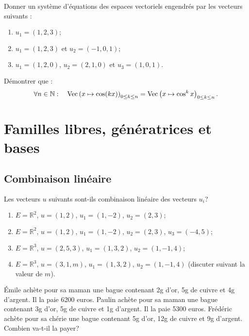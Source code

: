 \documentclass{book}
\begin{document}
 \begin{Exercice}
Donner un système d'équations des espaces vectoriels engendrés par les vecteurs suivants :
\begin{enumerate}
\item $u_1=(1,2,3)$;
\item $u_1=(1,2,3)$ et $u_2=(-1,0,1)$;
\item $u_1=(1,2,0)$, $u_2=(2,1,0)$ et $u_3=(1,0,1)$.
\end{enumerate}
\end{Exercice}
 \begin{Exercice}[**, trigonométrie]
Démontrer que :
$$\forall n\in\mathbb{N} : \quad \text{Vec} \left( x\mapsto \cos(kx) \right)_{0\leq k\leq n}= \text{Vec} \left( x\mapsto \cos^k x \right)_{0\leq k\leq n}.$$ 
\end{Exercice}

\section{Familles libres, génératrices et bases}



\subsection{Combinaison linéaire}
 \begin{Exercice}
Les vecteurs $u$ suivants sont-ils combinaison linéaire des vecteurs $u_i$?
\begin{enumerate}
\item $E=\mathbb R^2$, $u=(1,2)$, $u_1=(1,-2)$, $u_2=(2,3)$;
\item $E=\mathbb R^2$, $u=(1,2)$, $u_1=(1,-2)$, $u_2=(2,3)$, $u_3=(-4,5)$;
\item $E=\mathbb R^3$, $u=(2,5,3)$, $u_1=(1,3,2)$, $u_2=(1,-1,4)$;
\item $E=\mathbb R^3$, $u=(3,1,m)$, $u_1=(1,3,2)$, $u_2=(1,-1,4)$ (discuter suivant la valeur de $m$).
\end{enumerate}
\end{Exercice}
 \begin{Exercice}
\'Emile achète pour sa maman une bague contenant 2g d'or, 5g de cuivre et 4g d'argent. Il la paie 6200 euros.\newline
Paulin achète pour sa maman une bague contenant 3g d'or, 5g de cuivre et 1g d'argent. Il la paie 5300 euros.\newline
Frédéric achète pour sa chérie une bague contenant 5g d'or, 12g de cuivre et 9g d'argent. Combien va-t-il la payer?
\end{Exercice}
\end{document}
